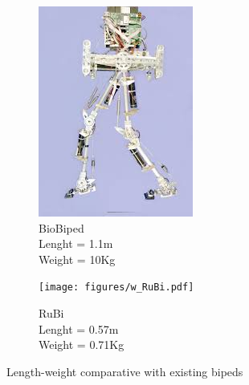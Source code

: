 \begin{figure}[h]
\begin{subfigure}{.22\textwidth}
    \includegraphics[width=\linewidth]{figures/w_biobiped.jpg}
    \caption{BioBiped\\
    Lenght = 1.1m\\
    Weight = 10Kg}
    \label{fig:w_biobiped}
  \end{subfigure}
  \begin{subfigure}{.22\textwidth}
    \texttt{[image: figures/w\_RuBi.pdf]}
    \caption{RuBi\\
    Lenght = 0.57m\\
    Weight = 0.71Kg}
    \label{fig:w_rubi}
  \end{subfigure}
  \caption{Length-weight comparative with existing bipeds}
  \label{fig:bipedal_robots}
\end{figure}  


